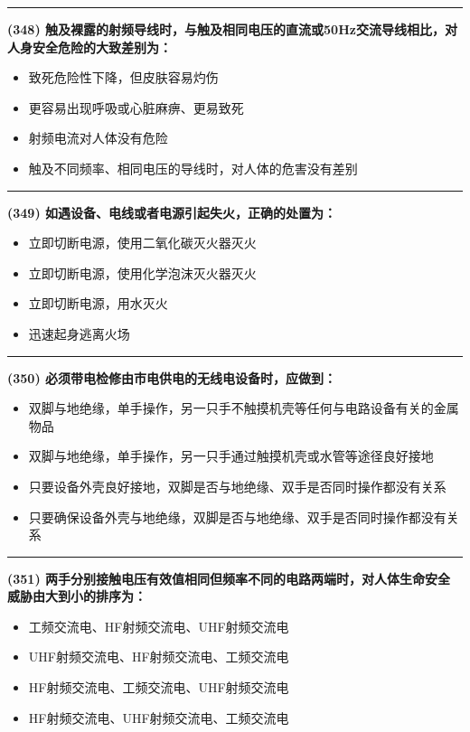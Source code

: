 \documentclass[twocolumn]{ctexart}  %
\begin{document}
\noindent\rule{0.5\textwidth}{1pt}
\heiti \textbf{(348) 触及裸露的射频导线时，与触及相同电压的直流或50Hz交流导线相比，对人身安全危险的大致差别为：} \songti {\color{gray} [LK1001] }
\begin{itemize}
	\item  致死危险性下降，但皮肤容易灼伤
	\item  更容易出现呼吸或心脏麻痹、更易致死
	\item  射频电流对人体没有危险
	\item  触及不同频率、相同电压的导线时，对人体的危害没有差别
\end{itemize}


\noindent\rule{0.5\textwidth}{1pt}
\heiti \textbf{(349) 如遇设备、电线或者电源引起失火，正确的处置为：} \songti {\color{gray} [LK1039] }
\begin{itemize}
	\item  立即切断电源，使用二氧化碳灭火器灭火
	\item  立即切断电源，使用化学泡沫灭火器灭火
	\item  立即切断电源，用水灭火
	\item  迅速起身逃离火场
\end{itemize}


\noindent\rule{0.5\textwidth}{1pt}
\heiti \textbf{(350) 必须带电检修由市电供电的无线电设备时，应做到：} \songti {\color{gray} [LK1040] }
\begin{itemize}
	\item  双脚与地绝缘，单手操作，另一只手不触摸机壳等任何与电路设备有关的金属物品
	\item  双脚与地绝缘，单手操作，另一只手通过触摸机壳或水管等途径良好接地
	\item  只要设备外壳良好接地，双脚是否与地绝缘、双手是否同时操作都没有关系
	\item  只要确保设备外壳与地绝缘，双脚是否与地绝缘、双手是否同时操作都没有关系
\end{itemize}


\noindent\rule{0.5\textwidth}{1pt}
\heiti \textbf{(351) 两手分别接触电压有效值相同但频率不同的电路两端时，对人体生命安全威胁由大到小的排序为：} \songti {\color{gray} [LK1043] }
\begin{itemize}
	\item  工频交流电、HF射频交流电、UHF射频交流电
	\item  UHF射频交流电、HF射频交流电、工频交流电
	\item  HF射频交流电、工频交流电、UHF射频交流电
	\item  HF射频交流电、UHF射频交流电、工频交流电
\end{itemize}
\end{document}
